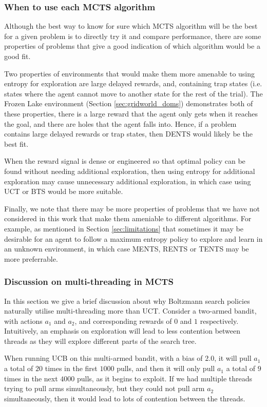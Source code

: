 \documentclass{article}
\theoremstyle{plain}
\begin{document}
\begin{appendices}
		
		\subsubsection{When to use each MCTS algorithm}
			Although the best way to know for sure which MCTS algorithm will be the best for a given problem is to directly try it and compare performance, there are some properties of problems that give a good indication of which algorithm would be a good fit.
			
			Two properties of environments that would make them more amenable to using entropy for exploration are large delayed rewards, and, containing trap states (i.e. states where the agent cannot move to another state for the rest of the trial). The Frozen Lake environment (Section \ref{sec:gridworld_doms}) demonstrates both of these properties, there is a large reward that the agent only gets when it reaches the goal, and there are holes that the agent falls into. Hence, if a problem contains large delayed rewards or trap states, then DENTS would likely be the best fit.
			
			When the reward signal is dense or engineered so that optimal policy can be found without needing additional exploration, then using entropy for additional exploration may cause unnecessary additional exploration, in which case using UCT or BTS would be more suitable.
			
			Finally, we note that there may be more properties of problems that we have not considered in this work that make them ameniable to different algorithms. For example, as mentioned in Section \ref{sec:limitations} that sometimes it may be desirable for an agent to follow a maximum entropy policy to explore and learn in an unknown environment, in which case MENTS, RENTS or TENTS may be more preferrable.


	    \subsubsection{Discussion on multi-threading in MCTS} \label{app:multi_thread}
	        In this section we give a brief discussion about why Boltzmann search policies naturally utilise multi-threading more than UCT. Consider a two-armed bandit, with actions $a_1$ and $a_2$, and corresponding rewards of $0$ and $1$ respectively. Intuitively, an emphasis on exploration will lead to less contention between threads as they will explore different parts of the search tree.
	        
	        When running UCB on this multi-armed bandit, with a bias of $2.0$, it will pull $a_1$ a total of $20$ times in the first $1000$ pulls, and then it will only pull $a_1$ a total of $9$ times in the next $4000$ pulls, as it begins to exploit. If we had multiple threads trying to pull arms simultaneously, but they could not pull arm $a_2$ simultaneously, then it would lead to lots of contention between the threads.
	

\end{appendices}
\end{document}
